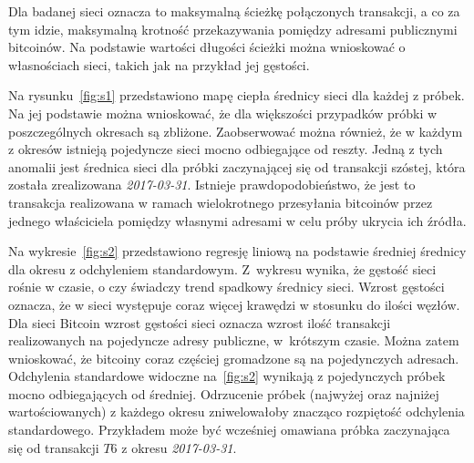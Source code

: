 \documentclass[12pt, twoside, final, openany]{mgr}
\begin{document}
\indent Dla badanej sieci oznacza to maksymalną ścieżkę połączonych transakcji, a co za tym idzie, maksymalną krotność przekazywania pomiędzy adresami publicznymi bitcoinów. Na podstawie wartości długości ścieżki można wnioskować o własnościach sieci, takich jak na przykład jej gęstości.

\indent Na rysunku~\ref{fig:s1} przedstawiono mapę ciepła średnicy sieci dla każdej z próbek. Na jej podstawie można wnioskować, że dla większości przypadków próbki w poszczególnych okresach są zbliżone. Zaobserwować można również, że w każdym z okresów istnieją pojedyncze sieci mocno odbiegające od reszty. Jedną z tych anomalii jest średnica sieci dla próbki zaczynającej się od transakcji szóstej, która została zrealizowana \textit{2017-03-31}. Istnieje prawdopodobieństwo, że jest to transakcja realizowana w ramach wielokrotnego przesyłania bitcoinów przez jednego właściciela pomiędzy własnymi adresami w celu próby ukrycia ich źródła.

\indent Na wykresie~\ref{fig:s2} przedstawiono regresję liniową na podstawie średniej średnicy dla okresu z odchyleniem standardowym. Z~wykresu wynika, że gęstość sieci rośnie w czasie, o czy świadczy trend spadkowy średnicy sieci. Wzrost gęstości oznacza, że w sieci występuje coraz więcej krawędzi w stosunku do ilości węzłów. Dla sieci Bitcoin wzrost gęstości sieci oznacza wzrost ilość transakcji realizowanych na pojedyncze adresy publiczne, w~krótszym czasie. Można zatem wnioskować, że bitcoiny coraz częściej gromadzone są na pojedynczych adresach. Odchylenia standardowe widoczne na~\ref{fig:s2} wynikają z pojedynczych próbek mocno odbiegających od średniej. Odrzucenie próbek (najwyżej oraz najniżej wartościowanych) z każdego okresu zniwelowałoby znacząco rozpiętość odchylenia standardowego. Przykładem może być wcześniej omawiana próbka zaczynająca się od transakcji $T6$ z okresu \textit{2017-03-31}. 
\end{document}
